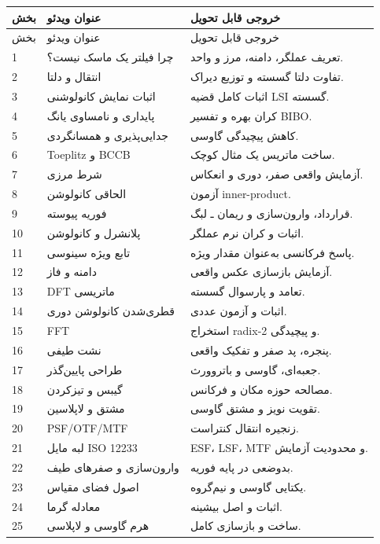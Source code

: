 \documentclass[12pt,openany,oneside]{book}
\begin{document}
\begin{videobox}
\begin{longtable}{p{}p{}p{}}
\toprule
بخش & عنوان ویدئو & خروجی قابل تحویل\\
\midrule
\endfirsthead
\toprule
بخش & عنوان ویدئو & خروجی قابل تحویل\\
\midrule
\endhead
1 & چرا فیلتر یک ماسک نیست؟ & تعریف عملگر، دامنه، مرز و واحد.\\
2 & انتقال و دلتا & تفاوت دلتا گسسته و توزیع دیراک.\\
3 & اثبات نمایش کانولوشنی & اثبات کامل قضیه LSI گسسته.\\
4 & پایداری و نامساوی یانگ & کران بهره و تفسیر BIBO.\\
5 & جدایی‌پذیری و همسانگردی & کاهش پیچیدگی گاوسی.\\
6 & Toeplitz و BCCB & ساخت ماتریس یک مثال کوچک.\\
7 & شرط مرزی & آزمایش واقعی صفر، دوری و انعکاس.\\
8 & الحاقی کانولوشن & آزمون inner-product.\\
9 & فوریه پیوسته & قرارداد، وارون‌سازی و ریمان ـ لبگ.\\
10 & پلانشرل و کانولوشن & اثبات و کران نرم عملگر.\\
11 & تابع ویژه سینوسی & پاسخ فرکانسی به‌عنوان مقدار ویژه.\\
12 & دامنه و فاز & آزمایش بازسازی عکس واقعی.\\
13 & DFT ماتریسی & تعامد و پارسوال گسسته.\\
14 & قطری‌شدن کانولوشن دوری & اثبات و آزمون عددی.\\
15 & FFT & استخراج radix-2 و پیچیدگی.\\
16 & نشت طیفی & پنجره، پد صفر و تفکیک واقعی.\\
17 & طراحی پایین‌گذر & جعبه‌ای، گاوسی و باتروورث.\\
18 & گیبس و تیزکردن & مصالحه حوزه مکان و فرکانس.\\
19 & مشتق و لاپلاسین & تقویت نویز و مشتق گاوسی.\\
20 & PSF/OTF/MTF & زنجیره انتقال کنتراست.\\
21 & لبه مایل ISO 12233 & ESF، LSF، MTF و محدودیت آزمایش.\\
22 & وارون‌سازی و صفرهای طیف & بدوضعی در پایه فوریه.\\
23 & اصول فضای مقیاس & یکتایی گاوسی و نیم‌گروه.\\
24 & معادله گرما & اثبات و اصل بیشینه.\\
25 & هرم گاوسی و لاپلاسی & ساخت و بازسازی کامل.\\

\end{longtable}
\end{videobox}
\end{document}
